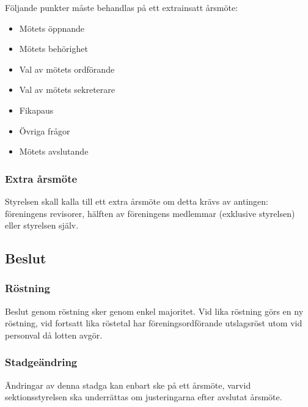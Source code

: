 \documentclass[11pt, noincludeaddress]{classes/cthit}
\begin{document}
Följande punkter måste behandlas på ett extrainsatt årsmöte: 
\begin{itemize}
    \item Mötets öppnande 
    \item Mötets behörighet 
    \item Val av mötets ordförande 
    \item Val av mötets sekreterare 
    \item Fikapaus 
    \item Övriga frågor 
    \item Mötets avslutande 
\end{itemize}

\subsubsection{Extra årsmöte}
Styrelsen skall kalla till ett extra årsmöte om detta krävs av antingen:
föreningens revisorer, hälften av föreningens medlemmar (exklusive
styrelsen) eller styrelsen själv.

\subsection{Beslut}

\subsubsection{Röstning}
Beslut genom röstning sker genom enkel majoritet. Vid lika röstning görs en ny röstning, vid fortsatt lika röstetal har föreningsordförande utslagsröst utom vid personval då lotten avgör. 

\subsubsection{Stadgeändring}
Ändringar av denna stadga kan enbart ske på ett årsmöte, varvid sektionsstyrelsen ska underrättas om justeringarna efter avslutat årsmöte. 
\end{document}
